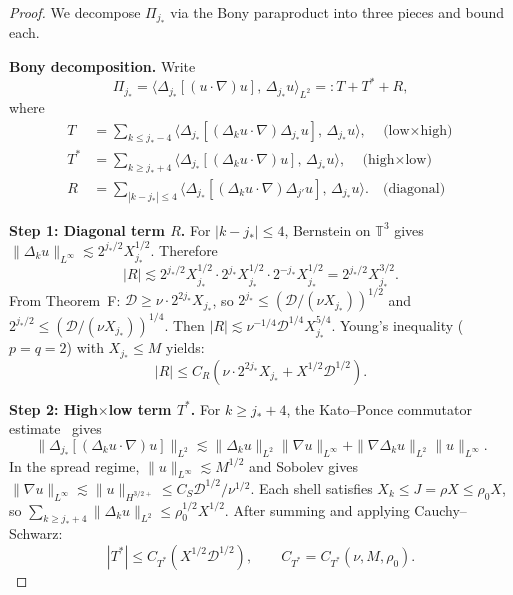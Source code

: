 \documentclass[11pt]{article}
\newcommand{\norm}[2]{\|{#1}\|_{#2}}
\newcommand{\T}{\mathbb{T}}
\newcommand{\DD}{\mathcal{D}}
\begin{document}
\begin{proof}
We decompose $\Pi_{j_*}$ via the Bony paraproduct into three pieces
and bound each.

\medskip\noindent\textbf{Bony decomposition.}
Write
\[
  \Pi_{j_*}
  = \langle \Delta_{j_*}[(u \cdot \nabla)u],\, \Delta_{j_*} u \rangle_{L^2}
  =: T + T^* + R,
\]
where
\begin{align*}
  T   &= \sum_{k \le j_*-4}
         \langle \Delta_{j_*}[(\Delta_k u \cdot \nabla)\Delta_{j_*} u],\,
         \Delta_{j_*} u \rangle,
         \quad\text{(low$\times$high)}\\
  T^* &= \sum_{k \ge j_*+4}
         \langle \Delta_{j_*}[(\Delta_k u \cdot \nabla)u],\,
         \Delta_{j_*} u \rangle,
         \quad\text{(high$\times$low)}\\
  R   &= \sum_{|k-j_*|\le 4}
         \langle \Delta_{j_*}[(\Delta_k u \cdot \nabla)\Delta_{j'} u],\,
         \Delta_{j_*} u \rangle.
         \quad\text{(diagonal)}
\end{align*}

\medskip\noindent\textbf{Step 1: Diagonal term $R$.}
For $|k-j_*|\le 4$, Bernstein on $\T^3$ gives
$\norm{\Delta_k u}{L^\infty} \lesssim 2^{j_*/2} X_{j_*}^{1/2}$.
Therefore
\[
  |R| \lesssim 2^{j_*/2} X_{j_*}^{1/2}
    \cdot 2^{j_*} X_{j_*}^{1/2} \cdot 2^{-j_*} X_{j_*}^{1/2}
  = 2^{j_*/2} X_{j_*}^{3/2}.
\]
From Theorem~F: $\DD \ge \nu \cdot 2^{2j_*} X_{j_*}$,
so $2^{j_*} \le (\DD/(\nu X_{j_*}))^{1/2}$
and $2^{j_*/2} \le (\DD/(\nu X_{j_*}))^{1/4}$.
Then $|R| \lesssim \nu^{-1/4}\DD^{1/4} X_{j_*}^{5/4}$.
Young's inequality ($p = q = 2$) with $X_{j_*} \le M$ yields:
\begin{equation}\label{eq:Rbound}
  |R| \le C_R\!\left(\nu \cdot 2^{2j_*} X_{j_*} + X^{1/2}\DD^{1/2}\right).
\end{equation}

\medskip\noindent\textbf{Step 2: High$\times$low term $T^*$.}
For $k \ge j_*+4$, the Kato--Ponce commutator estimate~\cite{KP1988} gives
\[
  \norm{\Delta_{j_*}[(\Delta_k u \cdot \nabla)u]}{L^2}
  \lesssim \norm{\Delta_k u}{L^2}\norm{\nabla u}{L^\infty}
    + \norm{\nabla \Delta_k u}{L^2}\norm{u}{L^\infty}.
\]
In the spread regime, $\norm{u}{L^\infty} \lesssim M^{1/2}$
and Sobolev gives $\norm{\nabla u}{L^\infty}
\lesssim \norm{u}{H^{3/2+}} \le C_S\DD^{1/2}/\nu^{1/2}$.
Each shell satisfies $X_k \le J = \rho X \le \rho_0 X$, so
$\sum_{k\ge j_*+4}\norm{\Delta_k u}{L^2} \le \rho_0^{1/2} X^{1/2}$.
After summing and applying Cauchy--Schwarz:
\begin{equation}\label{eq:Tstarbound}
  |T^*| \le C_{T^*}\!\left(X^{1/2}\DD^{1/2}\right),
  \qquad C_{T^*} = C_{T^*}(\nu, M, \rho_0).
\end{equation}


\end{proof}
\end{document}
